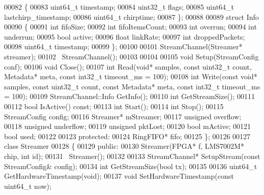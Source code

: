 \begin{DoxyCode}
00082     \{
00083         uint64\_t timestamp;
00084         uint32\_t flags;
00085         uint64\_t lastchirp_timestamp;
00086         uint64\_t chirptime;
00087     \};
00088 
00089     \textcolor{keyword}{struct }Info
00090     \{
00091         \textcolor{keywordtype}{int} fifoSize;
00092         \textcolor{keywordtype}{int} fifoItemsCount;
00093         \textcolor{keywordtype}{int} overrun;
00094         \textcolor{keywordtype}{int} underrun;
00095         \textcolor{keywordtype}{bool} active;
00096         \textcolor{keywordtype}{float} linkRate;
00097         \textcolor{keywordtype}{int} droppedPackets;
00098         uint64\_t timestamp;
00099     \};
00100 
00101     StreamChannel(Streamer* streamer);
00102     ~StreamChannel();
00103 
00104 
00105     \textcolor{keywordtype}{void} Setup(StreamConfig conf);
00106     \textcolor{keywordtype}{void} Close();
00107     \textcolor{keywordtype}{int} Read(\textcolor{keywordtype}{void}* samples, \textcolor{keyword}{const} uint32\_t count, Metadata* meta, \textcolor{keyword}{const} int32\_t 
      timeout_ms = 100);
00108     \textcolor{keywordtype}{int} Write(\textcolor{keyword}{const} \textcolor{keywordtype}{void}* samples, \textcolor{keyword}{const} uint32\_t count, \textcolor{keyword}{const} Metadata* meta, \textcolor{keyword}{const} int32\_t 
      timeout_ms = 100);
00109     StreamChannel::Info GetInfo();
00110     \textcolor{keywordtype}{int} GetStreamSize();
00111 
00112     \textcolor{keywordtype}{bool} IsActive() \textcolor{keyword}{const};
00113     \textcolor{keywordtype}{int} Start();
00114     \textcolor{keywordtype}{int} Stop();
00115     StreamConfig config;
00116     Streamer* mStreamer;
00117     \textcolor{keywordtype}{unsigned} overflow;
00118     \textcolor{keywordtype}{unsigned} underflow;
00119     \textcolor{keywordtype}{unsigned} pktLost;
00120     \textcolor{keywordtype}{bool} mActive;
00121     \textcolor{keywordtype}{bool} used;
00122 
00123 \textcolor{keyword}{protected}:
00124     RingFIFO* fifo;
00125 \};
00126 
00127 \textcolor{keyword}{class }Streamer
00128 \{
00129 \textcolor{keyword}{public}:
00130     Streamer(FPGA* f, LMS7002M* chip, \textcolor{keywordtype}{int} \textcolor{keywordtype}{id});
00131     ~Streamer();
00132 
00133     StreamChannel* SetupStream(\textcolor{keyword}{const} StreamConfig& config);
00134     \textcolor{keywordtype}{int} GetStreamSize(\textcolor{keywordtype}{bool} tx);
00135 
00136     uint64\_t GetHardwareTimestamp(\textcolor{keywordtype}{void});
00137     \textcolor{keywordtype}{void} SetHardwareTimestamp(\textcolor{keyword}{const} uint64\_t now);

\end{DoxyCode}
